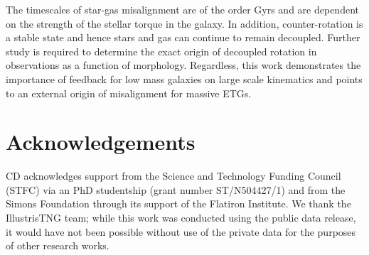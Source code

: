 \documentclass[fleqn,usenatbib]{mnras}
\begin{document}
The timescales of star-gas misalignment are of the order Gyrs and are dependent on the strength of the stellar torque in the galaxy. In addition, counter-rotation is a stable state and hence stars and gas can continue to remain decoupled. Further study is required to determine the exact origin of decoupled rotation in observations as a function of morphology. Regardless, this work demonstrates the importance of feedback for low mass galaxies on large scale kinematics and points to an external origin of misalignment for massive ETGs.

\section*{Acknowledgements}
CD acknowledges support from the Science and Technology Funding Council (STFC) via an PhD studentship (grant number ST/N504427/1) and from the Simons Foundation through its support of the Flatiron Institute. We thank the IllustrisTNG team; while this work was conducted using the public data release, it would have not been possible without use of the private data for the purposes of other research works. 





 



\bsp	%
\label{lastpage}
\end{document}
